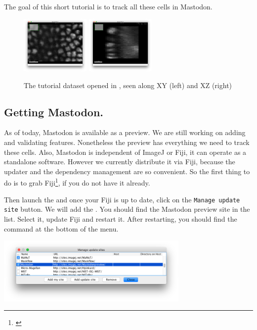 The goal of this short tutorial is to track all these cells in Mastodon.

\begin{figure}
     \centering
         \includegraphics[width=0.3\textwidth]{figures/BDV-imageXY.png}
         \includegraphics[width=0.3\textwidth]{figures/BDV-imageXZ.png}
         \caption{The tutorial dataset opened in \Bdv, seen along XY (left) and XZ (right)}
     \label{fig:OpeningImage}
\end{figure}  




\subsection{Getting Mastodon.}

As of today, Mastodon is available as a preview. We are still working on adding and validating features.
Nonetheless the preview has everything we need to track these cells.
Also, Mastodon is independent of ImageJ or Fiji, it can operate as a standalone software. 
However we currently distribute it via Fiji, because the updater and the dependency management are so convenient. 
So the first thing to do is to grab Fiji\footnote{\href{http://fiji.sc/}{}}, if you do not have it already.

Then launch the  and once your Fiji is up to date, click on the \texttt{Manage update site} button.
We will add the .
You should find the Mastodon preview site in the list. 
Select it, update Fiji and restart it. 
After restarting, you should find the command  at the bottom of the menu.

\begin{center}
    \includegraphics[width=0.7\textwidth]{figures/Mastodon_UpdateSite.png}
\end{center}

